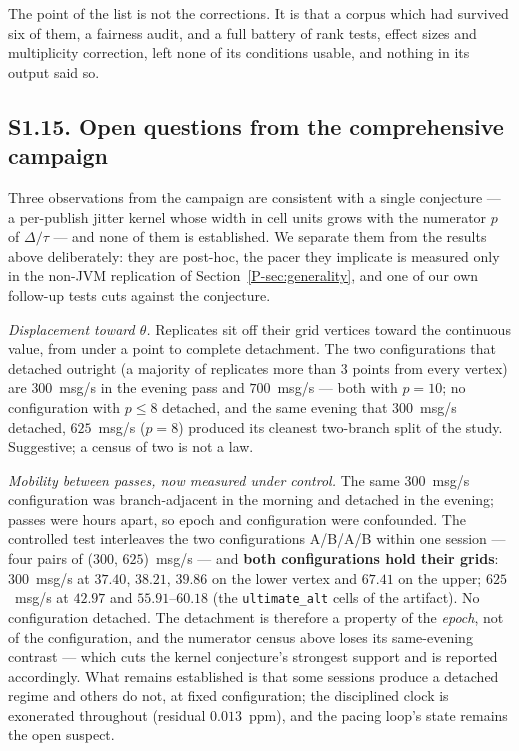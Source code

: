 \documentclass[10pt,journal,onecolumn]{IEEEtran}
\newcommand{\mainGenerality}{\ref{P-sec:generality}}       %
\begin{document}
The point of the list is not the corrections. It is that a corpus which had survived six of them,
a fairness audit, and a full battery of rank tests, effect sizes and multiplicity correction,
left none of its conditions usable, and nothing in its output said so.


\subsection{S1.15. Open questions from the comprehensive campaign}
Three observations from the campaign are consistent with a single conjecture --- a per-publish
jitter kernel whose width in cell units grows with the numerator $p$ of $\Delta/\tau$ --- and
none of them is established. We separate them from the results above deliberately: they are
post-hoc, the pacer they implicate is measured only in the non-JVM replication of Section~\mainGenerality{}, and one of our own follow-up tests cuts against the conjecture.

\emph{Displacement toward $\theta$.} Replicates sit off their grid vertices toward the
continuous value, from under a point to complete detachment. The two configurations that detached outright
(a majority of replicates more than $3$ points from every vertex) are $300$~msg/s in the evening
pass and $700$~msg/s --- both with $p = 10$; no configuration with $p \le 8$ detached, and the same
evening that $300$~msg/s detached, $625$~msg/s ($p = 8$) produced its cleanest two-branch split of
the study. Suggestive; a census of two is not a law.

\emph{Mobility between passes, now measured under control.} The same $300$~msg/s configuration
was branch-adjacent in the morning and detached in the evening; passes were hours apart, so
epoch and configuration were confounded. The controlled test interleaves the two configurations A/B/A/B within one
session --- four pairs of ($300$, $625$)~msg/s --- and \textbf{both configurations hold their grids}:
$300$~msg/s at $37.40$, $38.21$, $39.86$ on the lower vertex and $67.41$ on the upper;
$625$~msg/s at $42.97$ and $55.91$--$60.18$ (the \texttt{ultimate\_alt} cells of the artifact). No configuration detached. The detachment is therefore a
property of the \emph{epoch}, not of the configuration, and the numerator census above loses its
same-evening contrast --- which cuts the kernel conjecture's strongest support and is reported
accordingly. What remains established is that some sessions produce a detached regime and
others do not, at fixed configuration; the disciplined clock is exonerated throughout (residual
$0.013$~ppm), and the pacing loop's state remains the open suspect.
\end{document}

